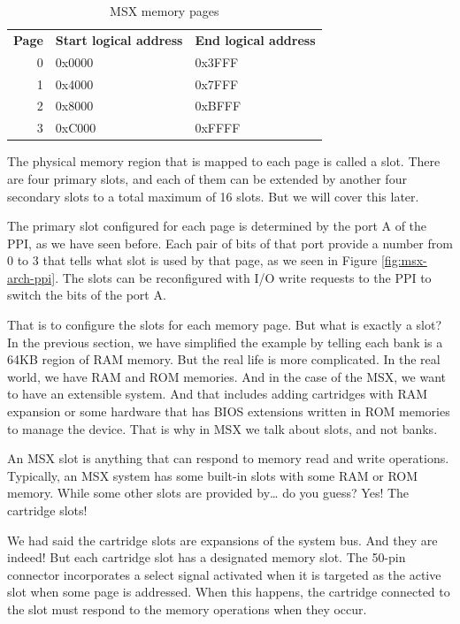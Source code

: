 \begin{table}[h]
	\centering
	\begin{tabular}{r|l|l}
		{\bf Page} & {\bf Start logical address} & {\bf End logical address} \\
		0          & 0x0000                      & 0x3FFF                    \\
		1          & 0x4000                      & 0x7FFF                    \\
		2          & 0x8000                      & 0xBFFF                    \\
		3          & 0xC000                      & 0xFFFF                    \\
	\end{tabular}
	\caption{MSX memory pages}
	\label{table:msx-mem-pages}
\end{table}

The physical memory region that is mapped to each page is called a slot. There are four primary slots, and each of them can be extended by another four secondary slots to a total maximum of 16 slots. But we will cover this later. 

The primary slot configured for each page is determined by the port A of the PPI, as we have seen before. Each pair of bits of that port provide a number from 0 to 3 that tells what slot is used by that page, as we seen in Figure \ref{fig:msx-arch-ppi}. The slots can be reconfigured with I/O write requests to the PPI to switch the bits of the port A. 

That is to configure the slots for each memory page. But what is exactly a slot? In the previous section, we have simplified the example by telling each bank is a 64KB region of RAM memory. But the real life is more complicated. In the real world, we have RAM and ROM memories. And in the case of the MSX, we want to have an extensible system. And that includes adding cartridges with RAM expansion or some hardware that has BIOS extensions written in ROM memories to manage the device. That is why in MSX we talk about slots, and not banks. 

An MSX slot is anything that can respond to memory read and write operations. Typically, an MSX system has some built-in slots with some RAM or ROM memory. While some other slots are provided by… do you guess? Yes! The cartridge slots! 

We had said the cartridge slots are expansions of the system bus. And they are indeed! But each cartridge slot has a designated memory slot. The 50-pin connector incorporates a select signal activated when it is targeted as the active slot when some page is addressed. When this happens, the cartridge connected to the slot must respond to the memory operations when they occur.

